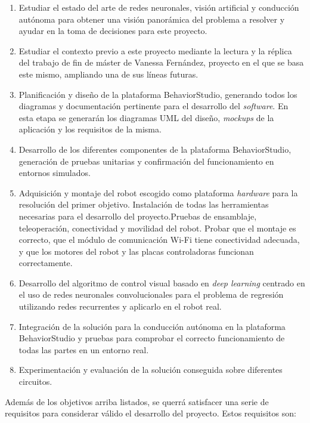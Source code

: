 \begin{enumerate}
    \item Estudiar el estado del arte de redes neuronales, visión artificial y conducción autónoma para obtener una visión panorámica del problema a resolver y ayudar en la toma de decisiones para este proyecto.
    \item Estudiar el contexto previo a este proyecto mediante la lectura y la réplica del trabajo de fin de máster de Vanessa Fernández, proyecto en el que se basa este mismo, ampliando una de sus líneas futuras.
    \item Planificación y diseño de la plataforma BehaviorStudio, generando todos los diagramas y documentación pertinente para el desarrollo del \textit{software}. En esta etapa se generarán los diagramas UML del diseño, \textit{mockups} de la aplicación y los requisitos de la misma.
    \item Desarrollo de los diferentes componentes de la plataforma BehaviorStudio, generación de pruebas unitarias y confirmación del funcionamiento en entornos simulados.
    \item Adquisición y montaje del robot escogido como plataforma \textit{hardware} para la resolución del primer objetivo. Instalación de todas las herramientas necesarias para el desarrollo del proyecto.Pruebas de ensamblaje, teleoperación, conectividad y movilidad del robot. Probar que el montaje es correcto, que el módulo de comunicación Wi-Fi tiene conectividad adecuada, y que los motores del robot y las placas controladoras funcionan correctamente.
    \item Desarrollo del algoritmo de control visual basado en \textit{deep learning} centrado en el uso de redes neuronales convolucionales para el problema de regresión utilizando redes recurrentes y aplicarlo en el robot real.
    \item Integración de la solución para la conducción autónoma en la plataforma BehaviorStudio y pruebas para comprobar el correcto funcionamiento de todas las partes en un entorno real.
    \item Experimentación y evaluación de la solución conseguida sobre diferentes circuitos.
    
\end{enumerate}

\noindent Además de los objetivos arriba listados, se querrá satisfacer una serie de requisitos para considerar válido el desarrollo del proyecto. Estos requisitos son:


